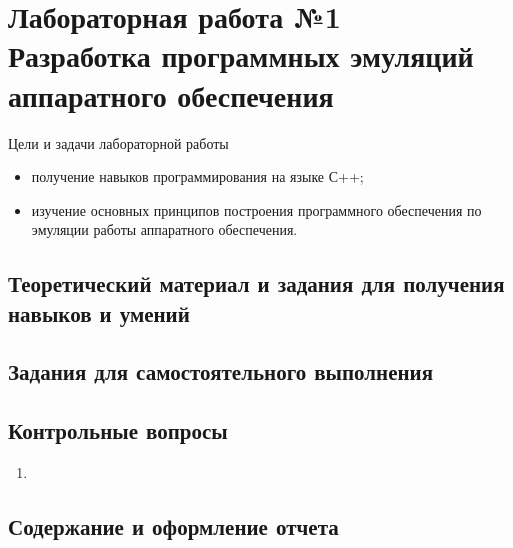 \documentclass[a4paper,report,14pt]{ncc}
\begin{document}
\section*{Лабораторная работа №1 \\ Разработка программных эмуляций аппаратного обеспечения}

Цели и задачи лабораторной работы

\begin{itemize}
 \item получение навыков программирования на языке С++;
 \item изучение основных принципов построения программного обеспечения по эмуляции работы аппаратного обеспечения.
\end{itemize}


\subsection{Теоретический материал и задания для получения навыков и умений}


\subsection{Задания для самостоятельного выполнения}


 \subsection{Контрольные вопросы}
 
 \begin{enumerate}
  \item 
 \end{enumerate}


\subsection{Содержание и оформление отчета}
\end{document}
